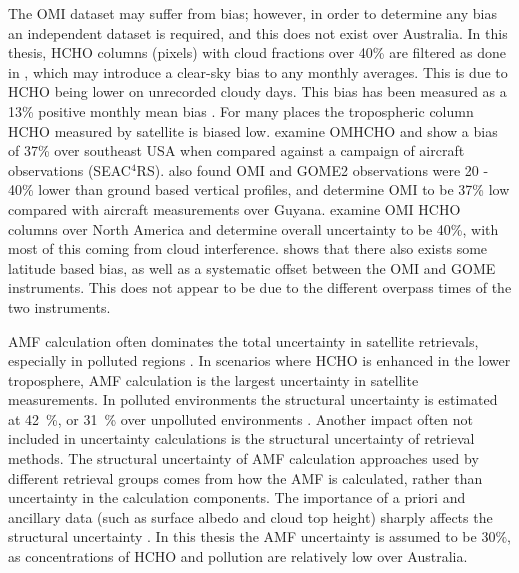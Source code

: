     The OMI dataset may suffer from bias; however, in order to determine any bias an independent dataset is required, and this does not exist over Australia.
    In this thesis, HCHO columns (pixels) with cloud fractions over 40\% are filtered as done in \textcite{Palmer2001}, which may introduce a clear-sky bias to any monthly averages.
    This is due to HCHO being lower on unrecorded cloudy days.
    This bias has been measured as a 13\% positive monthly mean bias \parencite{Palmer2001, Surl2018}.
    For many places the tropospheric column HCHO measured by satellite is biased low.
    \textcite{Zhu2016} examine OMHCHO and show a bias of 37\% %
    over southeast USA when compared against a campaign of aircraft observations (SEAC$^4$RS).
    \textcite{DeSmedt2015} also found OMI and GOME2 observations were 20 - 40\% lower than ground based vertical profiles, and \textcite{Barkley2013} determine OMI to be 37\% low compared with aircraft measurements over Guyana.
    \textcite{Millet2006} examine OMI HCHO columns over North America and determine overall uncertainty to be 40\%, with most of this coming from cloud interference.
    \textcite{Millet2008} shows that there also exists some latitude based bias, as well as a systematic offset between the OMI and GOME instruments.
    This does not appear to be due to the different overpass times of the two instruments.
    

    AMF calculation often dominates the total uncertainty in satellite retrievals, especially in polluted regions \parencite{Lorente2017}.
    In scenarios where HCHO is enhanced in the lower troposphere, AMF calculation is the largest uncertainty in satellite measurements.
    In polluted environments the structural uncertainty is estimated at 42~\%, or 31~\% over unpolluted environments \parencite{Lorente2017}.
    Another impact often not included in uncertainty calculations is the structural uncertainty of retrieval methods.
    The structural uncertainty of AMF calculation approaches used by different retrieval groups comes from how the AMF is calculated, rather than uncertainty in the calculation components.
    The importance of a priori and ancillary data (such as surface albedo and cloud top height) sharply affects the structural uncertainty \parencite{Lorente2017}.
    In this thesis the AMF uncertainty is assumed to be $30\%$, as concentrations of HCHO and pollution are relatively low over Australia.
    

